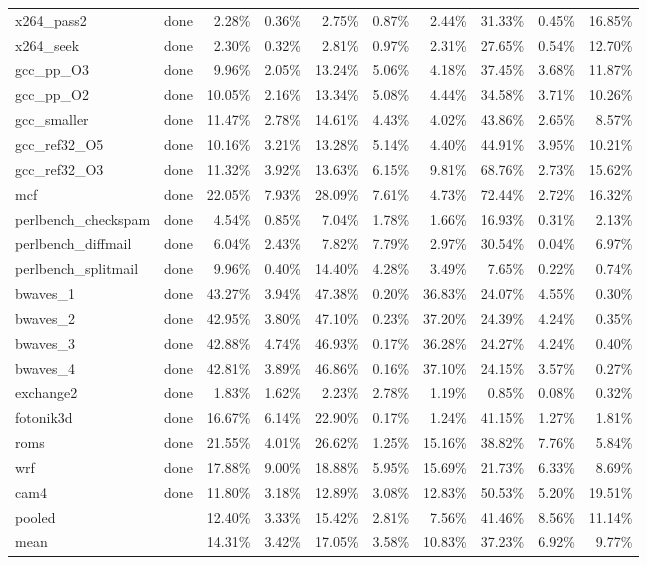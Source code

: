 \documentclass[10pt,a4paper,landscape]{article}
\begin{document}
{\begin{longtable}{llrrrrrrrr}
x264\_pass2 & done & 2.28\% & 0.36\% & 2.75\% & 0.87\% & 2.44\% & 31.33\% & 0.45\% & 16.85\% \\
x264\_seek & done & 2.30\% & 0.32\% & 2.81\% & 0.97\% & 2.31\% & 27.65\% & 0.54\% & 12.70\% \\
gcc\_pp\_O3 & done & 9.96\% & 2.05\% & 13.24\% & 5.06\% & 4.18\% & 37.45\% & 3.68\% & 11.87\% \\
gcc\_pp\_O2 & done & 10.05\% & 2.16\% & 13.34\% & 5.08\% & 4.44\% & 34.58\% & 3.71\% & 10.26\% \\
gcc\_smaller & done & 11.47\% & 2.78\% & 14.61\% & 4.43\% & 4.02\% & 43.86\% & 2.65\% & 8.57\% \\
gcc\_ref32\_O5 & done & 10.16\% & 3.21\% & 13.28\% & 5.14\% & 4.40\% & 44.91\% & 3.95\% & 10.21\% \\
gcc\_ref32\_O3 & done & 11.32\% & 3.92\% & 13.63\% & 6.15\% & 9.81\% & 68.76\% & 2.73\% & 15.62\% \\
mcf & done & 22.05\% & 7.93\% & 28.09\% & 7.61\% & 4.73\% & 72.44\% & 2.72\% & 16.32\% \\
perlbench\_checkspam & done & 4.54\% & 0.85\% & 7.04\% & 1.78\% & 1.66\% & 16.93\% & 0.31\% & 2.13\% \\
perlbench\_diffmail & done & 6.04\% & 2.43\% & 7.82\% & 7.79\% & 2.97\% & 30.54\% & 0.04\% & 6.97\% \\
perlbench\_splitmail & done & 9.96\% & 0.40\% & 14.40\% & 4.28\% & 3.49\% & 7.65\% & 0.22\% & 0.74\% \\
bwaves\_1 & done & 43.27\% & 3.94\% & 47.38\% & 0.20\% & 36.83\% & 24.07\% & 4.55\% & 0.30\% \\
bwaves\_2 & done & 42.95\% & 3.80\% & 47.10\% & 0.23\% & 37.20\% & 24.39\% & 4.24\% & 0.35\% \\
bwaves\_3 & done & 42.88\% & 4.74\% & 46.93\% & 0.17\% & 36.28\% & 24.27\% & 4.24\% & 0.40\% \\
bwaves\_4 & done & 42.81\% & 3.89\% & 46.86\% & 0.16\% & 37.10\% & 24.15\% & 3.57\% & 0.27\% \\
exchange2 & done & 1.83\% & 1.62\% & 2.23\% & 2.78\% & 1.19\% & 0.85\% & 0.08\% & 0.32\% \\
fotonik3d & done & 16.67\% & 6.14\% & 22.90\% & 0.17\% & 1.24\% & 41.15\% & 1.27\% & 1.81\% \\
roms & done & 21.55\% & 4.01\% & 26.62\% & 1.25\% & 15.16\% & 38.82\% & 7.76\% & 5.84\% \\
wrf & done & 17.88\% & 9.00\% & 18.88\% & 5.95\% & 15.69\% & 21.73\% & 6.33\% & 8.69\% \\
cam4 & done & 11.80\% & 3.18\% & 12.89\% & 3.08\% & 12.83\% & 50.53\% & 5.20\% & 19.51\% \\
\midrule
pooled &  & 12.40\% & 3.33\% & 15.42\% & 2.81\% & 7.56\% & 41.46\% & 8.56\% & 11.14\% \\
mean &  & 14.31\% & 3.42\% & 17.05\% & 3.58\% & 10.83\% & 37.23\% & 6.92\% & 9.77\% \\
\end{longtable}
}
\end{document}
